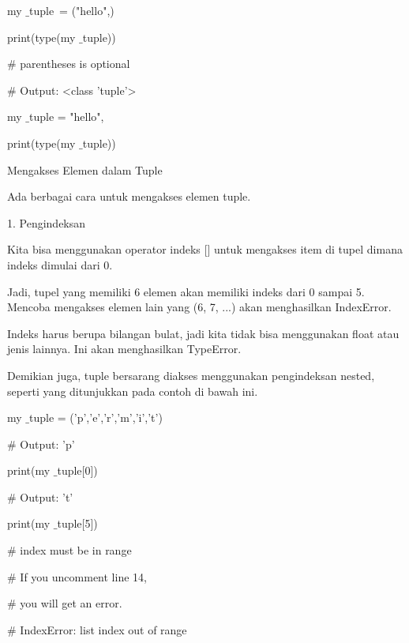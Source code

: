 my $  \_  $tuple~= ("hello",)   \par
print(type(my $  \_  $tuple)) \par
\vspace{12pt}
 $  \#  $ parentheses is optional \par
 $  \#  $ Output: <class 'tuple'> \par
my $  \_  $tuple = "hello", \par
print(type(my $  \_  $tuple)) \par
\vspace{12pt}
Mengakses Elemen dalam Tuple \par
\vspace{12pt}
Ada berbagai cara untuk mengakses elemen tuple. \par
1. Pengindeksan \par
\vspace{12pt}
Kita bisa menggunakan operator indeks [] untuk mengakses item di tupel dimana indeks dimulai dari 0. \par
\vspace{12pt}
Jadi, tupel yang memiliki 6 elemen akan memiliki indeks dari 0 sampai 5. Mencoba mengakses elemen lain yang (6, 7, ...) akan menghasilkan IndexError. \par
\vspace{12pt}
Indeks harus berupa bilangan bulat, jadi kita tidak bisa menggunakan float atau jenis lainnya. Ini akan menghasilkan TypeError. \par
\vspace{12pt}
Demikian juga, tuple bersarang diakses menggunakan pengindeksan nested, seperti yang ditunjukkan pada contoh di bawah ini. \par
my $  \_  $tuple = ('p','e','r','m','i','t') \par
\vspace{12pt}
 $  \#  $ Output: 'p' \par
print(my $  \_  $tuple[0]) \par
\vspace{12pt}
 $  \#  $ Output: 't' \par
print(my $  \_  $tuple[5]) \par
\vspace{12pt}
 $  \#  $ index must be in range \par
 $  \#  $ If you uncomment line 14, \par
 $  \#  $ you will get an error. \par
 $  \#  $ IndexError: list index out of range \par
